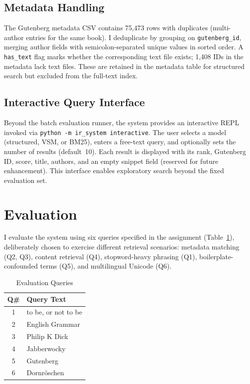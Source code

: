 \documentclass[sigconf,nonacm]{acmart}
\begin{document}
\subsection{Metadata Handling}
The Gutenberg metadata CSV contains 75{,}473 rows with duplicates (multi-author
entries for the same book).  I deduplicate by grouping on \texttt{gutenberg\_id},
merging author fields with semicolon-separated unique values in sorted order.
A \texttt{has\_text} flag marks whether the corresponding text file exists;
1{,}408 IDs in the metadata lack text files.  These are retained in the
metadata table for structured search but excluded from the full-text index.

\subsection{Interactive Query Interface}
Beyond the batch evaluation runner, the system provides an interactive
REPL invoked via \texttt{python -m ir\_system interactive}.  The user
selects a model (structured, VSM, or BM25), enters a free-text query,
and optionally sets the number of results (default~10).  Each result is
displayed with its rank, Gutenberg ID, score, title, authors, and an empty
snippet field (reserved for future enhancement).  This
interface enables exploratory search beyond the fixed evaluation set.

\section{Evaluation}\label{sec:eval}

I evaluate the system using six queries specified in the assignment
(Table~\ref{tab:queries}), deliberately chosen to exercise different retrieval
scenarios: metadata matching (Q2, Q3), content retrieval (Q4), stopword-heavy
phrasing (Q1), boilerplate-confounded terms (Q5), and multilingual Unicode (Q6).

\begin{table}[h]
\centering
\caption{Evaluation Queries}
\label{tab:queries}
\begin{tabular}{cl}
\toprule
Q\# & Query Text \\
\midrule
1 & to be, or not to be \\
2 & English Grammar \\
3 & Philip K Dick \\
4 & Jabberwocky \\
5 & Gutenberg \\
6 & Dornr\"oschen \\
\bottomrule
\end{tabular}
\end{table}
\end{document}
